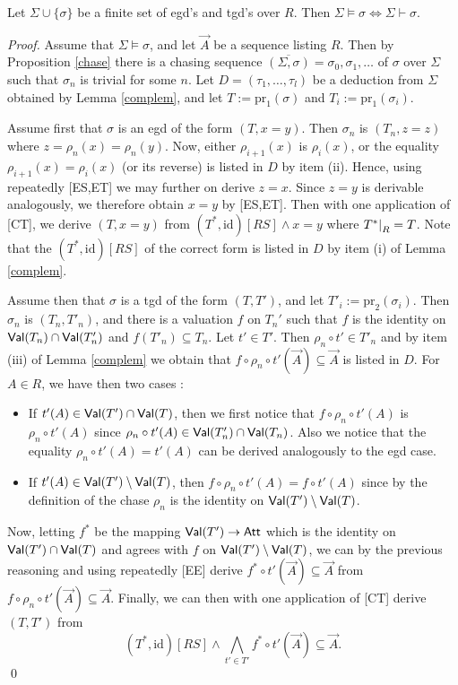 \documentclass[envcountset]{llncs}
\newcommand{\problemFont}[1]{\protect\ensuremath{\mathsf{#1}}}
\newcommand{\si}{\sigma}
\newcommand{\Si}{\Sigma}
\newcommand{\sub}{\subseteq}
\newcommand{\pr}{\mathrm{pr}}
\newcommand{\tuple}[1]{\vec{#1}}
\newcommand{\ja}{\wedge}
\newcommand{\at}{\problemFont{Att}}
\newcommand\re[2]{{\left.\kern-\nulldelimiterspace #1 \vphantom{|} \right|_{#2} }}
\newcommand{\Val}{\problemFont{Val}}
\newcommand{\chase}[1]{\overline{(#1)}}
\newcommand{\id}{\mathrm{id}}
\begin{document}
\begin{theorem}
Let $\Si\cup\{\si\}$ be a finite set of egd's and tgd's over $R$. Then  $\Si \models \si \Leftrightarrow \Si  \vdash \si$.
\end{theorem}
\begin{proof}
Assume that $\Si \models \si$, and let $\tuple A$ be a sequence listing $R$. Then by Proposition \ref{chase} there is a chasing sequence $\chase{\Si,\si}=\si_0, \si_1, \ldots $ of $\si$ over $\Si$ such that $\si_n$ is trivial for some $n$. Let $D=(\tau_1, \ldots ,\tau_l)$ be a deduction from $\Si$ obtained by Lemma \ref{complem}, and let $T:=\pr_1(\si)$ and $T_i:=\pr_1(\si_i)$.

Assume first that $\si$ is an egd of the form $(T,x=y)$. Then $\si_n$ is $(T_n,z=z)$ where $z=\rho_n(x)=\rho_n(y)$. Now, either $\rho_{i+1}(x)$ is $\rho_i(x)$, or the equality $\rho_{i+1}(x)=\rho_i(x)$ (or its reverse) is listed in $D$ by item (ii). Hence, using repeatedly [ES,ET] we may further on derive $z=x$. Since $z=y$ is derivable analogously, we therefore obtain $x=y$ by [ES,ET]. Then with one application of [CT], we  derive $(T,x=y)$ from $(T^*,\id)[RS] \wedge x=y$ where $\re{T^*}{R}=T$. Note that the $(T^*,\id)[RS]$ of the correct form is listed in $D$ by item (i) of Lemma \ref{complem}.


Assume then that $\si$ is a tgd of the form $(T,T')$, and let $ T'_i:= \pr_2(\si_i)$. Then $\si_n$ is $(T_n,T'_n)$, and there is a valuation $f$ on $T_n'$ such that $f$ is the identity on $\Val(T_n)\cap\Val(T'_n)$ and $f(T'_n)\sub T_n$.  Let  $t'\in T'$. Then $\rho_n\circ t'\in T'_n$ and by item (iii) of Lemma \ref{complem} we obtain that $f\circ \rho_n\circ t'(\tuple A )\sub \tuple A$ is listed in $D$.
For $A\in R$, we  have then two cases :
\begin{itemize}
\item If $t'(A) \in \Val(T')\cap\Val(T)$, then we first notice that $f\circ \rho_n\circ t'(A)$ is $\rho_n\circ t'(A)$ since  $\rho_n\circ t'(A) \in  \Val(T'_n)\cap\Val(T_n)$. Also we notice that the equality $\rho_n\circ t'(A)=t'(A)$ can be derived analogously to the egd case. 
\item If $t'(A) \in \Val(T')\setminus \Val(T)$, then $f\circ \rho_n \circ t' (A)= f\circ t'(A)$ since by the definition of the chase $\rho_n$ is the identity on $\Val(T')\setminus\Val(T)$. 

\end{itemize}
Now, letting $f^*$ be the mapping $\Val(T')\to \at$ which is the identity on $\Val(T')\cap \Val(T)$ and agrees with $f$ on $\Val(T')\setminus\Val(T)$, we can by the previous reasoning and using repeatedly [EE]  derive $f^*\circ t'(\tuple A) \sub \tuple A$ from $f\circ \rho_n \circ t' (\tuple A) \sub \tuple A$. Finally, we can then with one application of [CT] derive $(T,T')$ from 
$$(T^*,\id)[RS] \ja \bigwedge_{t'\in T'} f^*\circ t'(\tuple A) \sub \tuple A.$$ \qed

\end{proof}
\end{document}

